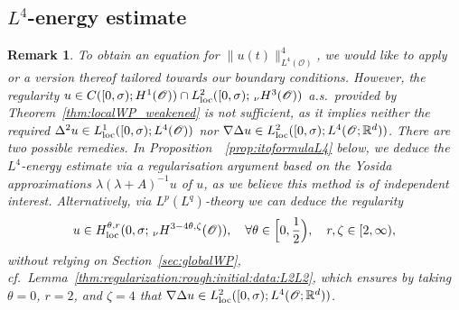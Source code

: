 \documentclass[reqno]{amsart}
\newtheorem{remark}[Satz]{Remark}
\newcommand{\R}{\mathbb{R}}
\newcommand{\sO}{\mathscr{O}}
\newcommand{\1}{\mathbf{1}}
\newcommand{\grad}{\nabla}
\newcommand{\loc}{\textup{loc}}
\newcommand{\nH}{\ensuremath{\,_\nu H}}
\begin{document}
 
\subsection{\texorpdfstring{$L^4$}{\textit{L4}}-energy estimate}\label{subsec:L4energyEst}

\begin{remark}
    To obtain an equation for $\|u(t)\|^4_{L^4(\sO)}$, we would like to apply~\cite[Lemma~A.6]{agrestiNonlinearSPDEsMaximal2025} or a version thereof tailored towards our boundary conditions. However, the regularity $u\in C([0,\sigma);H^1(\sO))\cap L^2_{\loc}([0,\sigma);\nH^3(\sO))$ a.s.\ provided by Theorem~\ref{thm:localWP_weakened} is not sufficient, as it implies neither the required $\Delta^2 u \in L^1_\loc ([0,\sigma); L^4(\sO))$ nor $\grad \Delta u \in L^2_\loc([0,\sigma); L^4(\sO; \R^d))$. There are two possible remedies. In Proposition~~\ref{prop:itoformulaL4} below, we deduce the $L^4$-energy estimate via a regularisation argument based on the Yosida approximations $\lambda(\lambda+A)^{-1}u$ of $u$, as we believe this method is of independent interest. Alternatively, via $L^p(L^q)$-theory we can deduce the regularity
    \[ 
        u\in H_\loc^{\theta,r}(0,\sigma; \nH^{3-4\theta,\zeta}(\sO)), \quad \forall \theta\in\Big[0,\frac{1}{2}\Big),\quad r,\zeta\in [2,\infty),
    \]
    without relying on Section~\ref{sec:globalWP}, cf.\ Lemma~\ref{thm:regularization:rough:initial:data:L2L2}, which ensures by taking $\theta = 0$, $r=2$, and $\zeta = 4$ that $\grad \Delta u \in L^2_{\loc}([0,\sigma); L^4(\sO; \R^d))$.
\end{remark}
\end{document}
